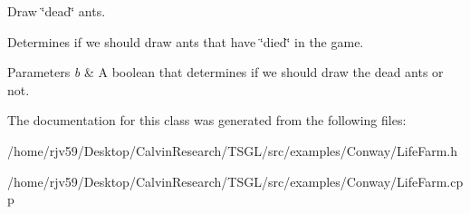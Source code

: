 Draw \char`\"{}dead\char`\"{} ants. 

Determines if we should draw ants that have \char`\"{}died\char`\"{} in the game. 
\begin{DoxyParams}{Parameters}
{\em b} & A boolean that determines if we should draw the dead ants or not. \\
\hline
\end{DoxyParams}


The documentation for this class was generated from the following files\+:\begin{DoxyCompactItemize}
\item 
/home/rjv59/\+Desktop/\+Calvin\+Research/\+T\+S\+G\+L/src/examples/\+Conway/Life\+Farm.\+h\item 
/home/rjv59/\+Desktop/\+Calvin\+Research/\+T\+S\+G\+L/src/examples/\+Conway/Life\+Farm.\+cpp\end{DoxyCompactItemize}
